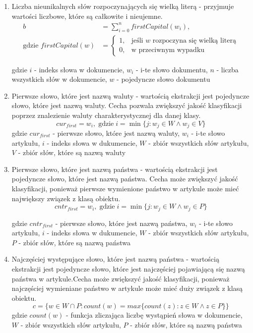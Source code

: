 \documentclass{article}
\begin{document}
\begin{enumerate}[label=c\arabic*.]
  \item Liczba nieunikalnych słów rozpoczynających się wielką literą - przyjmuje wartości liczbowe, które są całkowite i nieujemne.
  \begin{subequations} 
\begin{align}
b &= \sum_{i=0}^{n} firstCapital(w_i), \label{eq:main} \\
\text{gdzie } firstCapital(w) &= 
\begin{cases} 
1, & \text{jeśli } w \text{ rozpoczyna się wielką literą} \\
0, & \text{w przeciwnym wypadku} \label{eq:cases}
\end{cases}
\end{align}
\end{subequations}

gdzie  \(i\) - indeks słowa w dokumencie, \( w_{i} \) - i-te słowo dokumentu, \(n\) - liczba wszystkich słów w dokumencie, \(w\) - pojedyncze słowo dokumentu
  \item Pierwsze słowo, które jest nazwą waluty - wartością ekstrakcji jest pojedyncze słowo, które jest nazwą waluty. Cecha pozwala zwiększyć jakość klasyfikacji poprzez znalezienie waluty charakterystycznej dla danej klasy.
  \begin{equation}
      cur_{first} = w_i, \; \text{gdzie} \; i = \min \{ j: w_j \in W \land w_j \in V \}
  \end{equation}
gdzie \( cur_{first} \) - pierwsze słowo, które jest nazwą waluty, \( w_{i} \) - i-te słowo artykułu, \(i\) - indeks słowa w dukumencie, \(W\) - zbiór wszystkich słów artykułu, \(V\) - zbiór słów, które są nazwą waluty
  \item Pierwsze słowo, które jest nazwą państwa - wartością ekstrakcji jest pojedyncze słowo, które jest nazwą państwa. Cecha może zwiększyć jakość klasyfikacji, ponieważ pierwsze wymienione państwo w artykule może mieć największy związek z klasą obiektu. 
  \begin{equation}
      cntr_{first} = w_i, \; \text{gdzie} \; i = \min \{ j: w_j \in W \land w_j \in P \}
  \end{equation}

gdzie \( cntr_{first} \) - pierwsze słowo, które jest nazwą państwa, \( w_{i} \) - i-te słowo artykułu, \(i\) - indeks słowa w dukumencie, \(W\) - zbiór wszystkich słów artykułu, \(P\) - zbiór słów, które są nazwą państwa
  \item Najczęściej występujące słowo, które jest nazwą państwa - wartością ekstrakcji jest pojedyncze słowo, które jest najczęściej pojawiającą się nazwą państwa w artykule.Cecha może zwiększyć jakość klasyfikacji, ponieważ najczęściej wymieniane państwo w artykule może mieć duży związek z klasą obiektu. 
  \begin{equation}
  c = \{w \in W \cap P: count(w) = max \{count(z): z \in W \land z \in P\}\}
  \end{equation} 
gdzie \( count(w) \) - funkcja zliczająca liczbę wystąpień słowa w dokumencie, \(W\) - zbiór wszystkich słów artykułu, \(P\) - zbiór słów, które są nazwą państwa


\end{enumerate}
\end{document}
